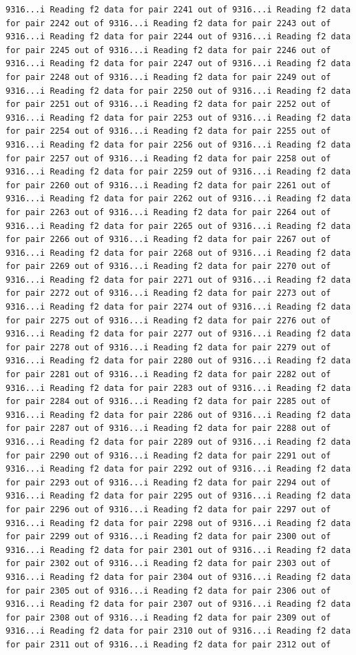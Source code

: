 \documentclass[
]{article}
\begin{document}
\begin{verbatim}
9316...i Reading f2 data for pair 2241 out of 9316...i Reading f2 data for pair 2242 out of 9316...i Reading f2 data for pair 2243 out of 9316...i Reading f2 data for pair 2244 out of 9316...i Reading f2 data for pair 2245 out of 9316...i Reading f2 data for pair 2246 out of 9316...i Reading f2 data for pair 2247 out of 9316...i Reading f2 data for pair 2248 out of 9316...i Reading f2 data for pair 2249 out of 9316...i Reading f2 data for pair 2250 out of 9316...i Reading f2 data for pair 2251 out of 9316...i Reading f2 data for pair 2252 out of 9316...i Reading f2 data for pair 2253 out of 9316...i Reading f2 data for pair 2254 out of 9316...i Reading f2 data for pair 2255 out of 9316...i Reading f2 data for pair 2256 out of 9316...i Reading f2 data for pair 2257 out of 9316...i Reading f2 data for pair 2258 out of 9316...i Reading f2 data for pair 2259 out of 9316...i Reading f2 data for pair 2260 out of 9316...i Reading f2 data for pair 2261 out of 9316...i Reading f2 data for pair 2262 out of 9316...i Reading f2 data for pair 2263 out of 9316...i Reading f2 data for pair 2264 out of 9316...i Reading f2 data for pair 2265 out of 9316...i Reading f2 data for pair 2266 out of 9316...i Reading f2 data for pair 2267 out of 9316...i Reading f2 data for pair 2268 out of 9316...i Reading f2 data for pair 2269 out of 9316...i Reading f2 data for pair 2270 out of 9316...i Reading f2 data for pair 2271 out of 9316...i Reading f2 data for pair 2272 out of 9316...i Reading f2 data for pair 2273 out of 9316...i Reading f2 data for pair 2274 out of 9316...i Reading f2 data for pair 2275 out of 9316...i Reading f2 data for pair 2276 out of 9316...i Reading f2 data for pair 2277 out of 9316...i Reading f2 data for pair 2278 out of 9316...i Reading f2 data for pair 2279 out of 9316...i Reading f2 data for pair 2280 out of 9316...i Reading f2 data for pair 2281 out of 9316...i Reading f2 data for pair 2282 out of 9316...i Reading f2 data for pair 2283 out of 9316...i Reading f2 data for pair 2284 out of 9316...i Reading f2 data for pair 2285 out of 9316...i Reading f2 data for pair 2286 out of 9316...i Reading f2 data for pair 2287 out of 9316...i Reading f2 data for pair 2288 out of 9316...i Reading f2 data for pair 2289 out of 9316...i Reading f2 data for pair 2290 out of 9316...i Reading f2 data for pair 2291 out of 9316...i Reading f2 data for pair 2292 out of 9316...i Reading f2 data for pair 2293 out of 9316...i Reading f2 data for pair 2294 out of 9316...i Reading f2 data for pair 2295 out of 9316...i Reading f2 data for pair 2296 out of 9316...i Reading f2 data for pair 2297 out of 9316...i Reading f2 data for pair 2298 out of 9316...i Reading f2 data for pair 2299 out of 9316...i Reading f2 data for pair 2300 out of 9316...i Reading f2 data for pair 2301 out of 9316...i Reading f2 data for pair 2302 out of 9316...i Reading f2 data for pair 2303 out of 9316...i Reading f2 data for pair 2304 out of 9316...i Reading f2 data for pair 2305 out of 9316...i Reading f2 data for pair 2306 out of 9316...i Reading f2 data for pair 2307 out of 9316...i Reading f2 data for pair 2308 out of 9316...i Reading f2 data for pair 2309 out of 9316...i Reading f2 data for pair 2310 out of 9316...i Reading f2 data for pair 2311 out of 9316...i Reading f2 data for pair 2312 out of 
\end{verbatim}
\end{document}
